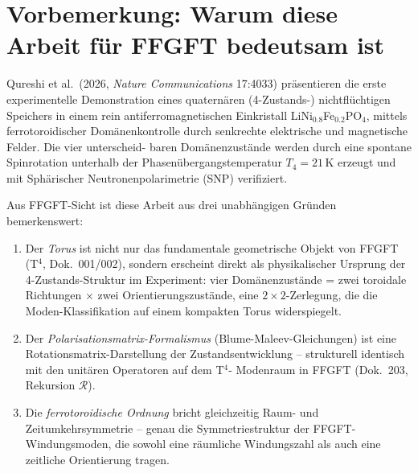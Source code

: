 %
%

\section*{Vorbemerkung: Warum diese Arbeit für FFGFT bedeutsam ist}

Qureshi et al.\ (2026, \emph{Nature Communications} 17:4033) präsentieren
die erste experimentelle Demonstration eines quaternären (4-Zustands-)
nichtflüchtigen Speichers in einem rein antiferromagnetischen Einkristall
LiNi$_{0.8}$Fe$_{0.2}$PO$_4$, mittels ferrotoroidischer Domänenkontrolle
durch senkrechte elektrische und magnetische Felder. Die vier unterscheid-
baren Domänenzustände werden durch eine spontane Spinrotation unterhalb der
Phasenübergangstemperatur $T_4 = 21$\,K erzeugt und mit Sphärischer
Neutronenpolarimetrie (SNP) verifiziert.

Aus FFGFT-Sicht ist diese Arbeit aus drei unabhängigen Gründen bemerkenswert:
\begin{enumerate}
  \item Der \emph{Torus} ist nicht nur das fundamentale geometrische Objekt
        von FFGFT (T$^4$, Dok.~001/002), sondern erscheint direkt als
        physikalischer Ursprung der 4-Zustands-Struktur im Experiment:
        vier Domänenzustände = zwei toroidale Richtungen $\times$ zwei
        Orientierungszustände, eine $2\times2$-Zerlegung, die die
        Moden-Klassifikation auf einem kompakten Torus widerspiegelt.
  \item Der \emph{Polarisationsmatrix-Formalismus} (Blume-Maleev-Gleichungen)
        ist eine Rotationsmatrix-Darstellung der Zustandsentwicklung --
        strukturell identisch mit den unitären Operatoren auf dem T$^4$-
        Modenraum in FFGFT (Dok.~203, Rekursion $\mathcal{R}$).
  \item Die \emph{ferrotoroidische Ordnung} bricht gleichzeitig Raum- und
        Zeitumkehrsymmetrie -- genau die Symmetriestruktur der FFGFT-
        Windungsmoden, die sowohl eine räumliche Windungszahl als auch eine
        zeitliche Orientierung tragen.
\end{enumerate}

